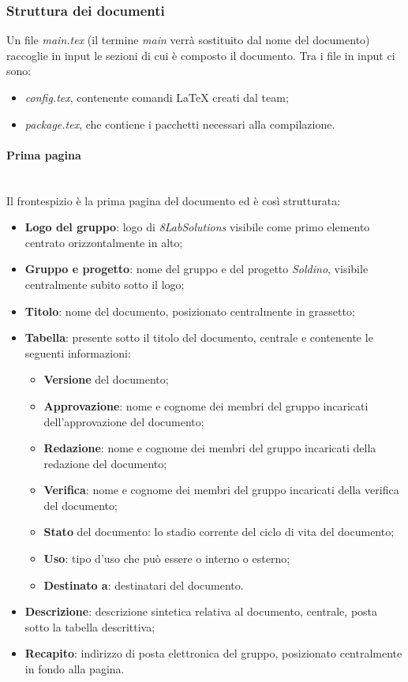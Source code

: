 		\subsubsection{Struttura dei documenti}
		Un file \textit{main.tex} (il termine \textit{main} verrà sostituito dal nome del documento) raccoglie in input le sezioni di cui è composto il documento. Tra i file in input ci sono:
		\begin{itemize}
			\item \textit{config.tex}, contenente comandi \LaTeX{} creati dal team;
			\item \textit{package.tex}, che contiene i pacchetti necessari alla compilazione.
		\end{itemize}

		\paragraph{Prima pagina} \mbox{}\\
		Il frontespizio è la prima pagina del documento ed è così strutturata:
		\begin{itemize}
			\item \textbf{Logo del gruppo}: logo di \textit{8LabSolutions} visibile come primo elemento centrato orizzontalmente in alto;
			\item \textbf{Gruppo e progetto}: nome del gruppo e del progetto \textit{Soldino}, visibile centralmente subito sotto il logo;
			\item \textbf{Titolo}: nome del documento, posizionato centralmente in grassetto;
			\item \textbf{Tabella}: presente sotto il titolo del documento, centrale e contenente le seguenti informazioni:
			\begin{itemize}
				\item \textbf{Versione} del documento;
				\item \textbf{Approvazione}: nome e cognome dei membri del gruppo incaricati dell'approvazione del documento;
				\item \textbf{Redazione}: nome e cognome dei membri del gruppo incaricati della redazione del documento;
				\item \textbf{Verifica}: nome e cognome dei membri del gruppo incaricati della verifica del documento;
				\item \textbf{Stato} del documento: lo stadio corrente del ciclo di vita del documento;
				\item \textbf{Uso}: tipo d'uso che può essere o interno o esterno;
				\item \textbf{Destinato a}: destinatari del documento.
			\end{itemize}
			\item \textbf{Descrizione}: descrizione sintetica relativa al documento, centrale, posta sotto la tabella descrittiva;
			\item \textbf{Recapito}: indirizzo di posta elettronica del gruppo, posizionato centralmente in fondo alla pagina.
		\end{itemize}
